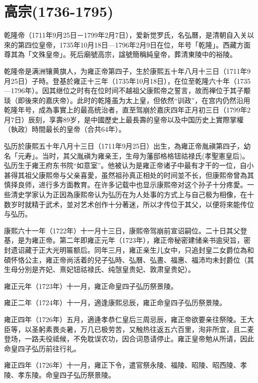 
\section{高宗\tiny(1736-1795)}

乾隆帝（1711年9月25日－1799年2月7日），爱新觉罗氏，名弘曆，是清朝自入关以來的第四位皇帝，1735年10月18日—1796年2月9日在位，年号「乾隆」。西藏方面尊其為「文殊皇帝」。死后廟號高宗，諡號簡稱純皇帝，葬清東陵中的裕陵。

乾隆帝是满洲镶黄旗人，为雍正帝第四子，生於康熙五十年八月十三日（1711年9月25日）子時。登基於雍正十三年（1735年10月18日），在位至乾隆六十年（1735—1796年）。因其继位之时有在位时间不越祖父康熙帝之誓言，故而禅位于其子颙琰（即後來的嘉庆帝）。此时的乾隆虽为太上皇，但依然“训政”，在宫内仍然沿用乾隆年号，成為事實上的最高统治者，直至驾崩於嘉庆四年正月初三日（1799年2月7日）辰刻，享壽89岁，是中國歷史上最長壽的皇帝以及中国历史上實際掌權（執政）時間最长的皇帝（合共64年）。

弘历於康熙五十年八月十三日（1711年9月25日）出生，為雍正帝胤禛第四子，幼名「元寿」。当时，其父胤禛为雍亲王，生母为藩邸格格钮祜禄氏(孝聖憲皇后)。弘历生于雍王府东书院“如意室”。他被认为是雍正帝诸子中最有才干的一位，自小甚得其祖父康熙帝与父亲喜愛，虽然祖孙真正相处的时间並不长，但康熙帝曾為其慎择良师，进行多方面教育。在许多记载中也显示康熙帝对这个孙子十分疼愛。一些清史学家认为正因為康熙帝认为弘历在为人处事的方式上与自己极为相像，在十数岁时就精于武术，並对艺术创作十分著迷，所以才传位于其父，以便将來能传位与弘历。

康熙六十一年（1722年）十一月十三日，康熙帝驾崩前宣诏嗣位。二十日其父登基，是为雍正帝。第二年即雍正元年（1723年），雍正帝秘密建储亲书逾臾旨，密封遗诏藏于正大光明匾额后。同年三月，雍正亲生儿女中，只追封皇二女爵位為和碩怀恪公主，雍正帝尚活着的兒子弘時、弘曆、弘晝、福惠、福沛均未封爵位（其生母分別是齐妃、熹妃钮祜禄氏、纯愨皇贵妃、敦肃皇贵妃）。

雍正元年（1723年）十一月，雍正命皇四子弘历祭景陵。

雍正二年（1724年）十一月，適逢康熙忌辰，雍正命皇四子弘历祭景陵。

雍正四年（1726年）五月，適逄孝恭仁皇后三周忌辰，雍正帝欲要亲往祭陵。王大臣等，以圣躬素畏炎暑，万几已极劳苦，又触热往返五六百里，洵非所宜，且二麦登场，一路夫役祗候，不免耽误农功，因合词恳请停止。雍正皇帝勉从所请，因此命皇四子弘历前往行礼。

雍正四年（1726年）十一月，雍正下令，遣官祭永陵、福陵、昭陵、昭西陵、孝陵、孝东陵。命皇四子弘历祭景陵。

